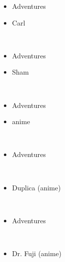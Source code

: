 \documentclass[a4paper,12pt]{article}
\begin{document}
\begin{itemize}
\item Adventures
\item Carl
\end{itemize}\\ \par \vspace{0.5cm}

\begin{itemize}
\item Adventures
\item Sham
\end{itemize}\\ \par \vspace{0.5cm}

\begin{itemize}
\item Adventures
\item anime
\end{itemize}\\ \par \vspace{0.5cm}

\begin{itemize}
\item Adventures
\end{itemize}\\ \par \vspace{0.5cm}

\begin{itemize}
\item Duplica (anime)
\end{itemize}\\ \par \vspace{0.5cm}

\begin{itemize}
\item Adventures
\end{itemize}\\ \par \vspace{0.5cm}

\begin{itemize}
\item Dr. Fuji (anime)
\end{itemize}\\ \par \vspace{0.5cm}
\end{document}
